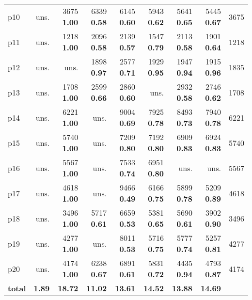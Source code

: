 \begin{tabular}{|l|rrrrrrr|r|}
p10 & uns. & {\footnotesize 3675} \textbf{1.00} & {\footnotesize 6339} \textbf{0.58} & {\footnotesize 6145} \textbf{0.60} & {\footnotesize 5943} \textbf{0.62} & {\footnotesize 5641} \textbf{0.65} & {\footnotesize 5445} \textbf{0.67} & 3675\\
p11 & uns. & {\footnotesize 1218} \textbf{1.00} & {\footnotesize 2096} \textbf{0.58} & {\footnotesize 2139} \textbf{0.57} & {\footnotesize 1547} \textbf{0.79} & {\footnotesize 2113} \textbf{0.58} & {\footnotesize 1901} \textbf{0.64} & 1218\\
p12 & uns. & uns. & {\footnotesize 1898} \textbf{0.97} & {\footnotesize 2577} \textbf{0.71} & {\footnotesize 1929} \textbf{0.95} & {\footnotesize 1947} \textbf{0.94} & {\footnotesize 1915} \textbf{0.96} & 1835\\
p13 & uns. & {\footnotesize 1708} \textbf{1.00} & {\footnotesize 2599} \textbf{0.66} & {\footnotesize 2860} \textbf{0.60} & uns. & {\footnotesize 2932} \textbf{0.58} & {\footnotesize 2746} \textbf{0.62} & 1708\\
p14 & uns. & {\footnotesize 6221} \textbf{1.00} & uns. & {\footnotesize 9004} \textbf{0.69} & {\footnotesize 7925} \textbf{0.78} & {\footnotesize 8493} \textbf{0.73} & {\footnotesize 7940} \textbf{0.78} & 6221\\
p15 & uns. & {\footnotesize 5740} \textbf{1.00} & uns. & {\footnotesize 7209} \textbf{0.80} & {\footnotesize 7192} \textbf{0.80} & {\footnotesize 6909} \textbf{0.83} & {\footnotesize 6924} \textbf{0.83} & 5740\\
p16 & uns. & {\footnotesize 5567} \textbf{1.00} & uns. & {\footnotesize 7533} \textbf{0.74} & {\footnotesize 6951} \textbf{0.80} & uns. & uns. & 5567\\
p17 & uns. & {\footnotesize 4618} \textbf{1.00} & uns. & {\footnotesize 9466} \textbf{0.49} & {\footnotesize 6166} \textbf{0.75} & {\footnotesize 5899} \textbf{0.78} & {\footnotesize 5209} \textbf{0.89} & 4618\\
p18 & uns. & {\footnotesize 3496} \textbf{1.00} & {\footnotesize 5717} \textbf{0.61} & {\footnotesize 6659} \textbf{0.53} & {\footnotesize 5381} \textbf{0.65} & {\footnotesize 5690} \textbf{0.61} & {\footnotesize 3902} \textbf{0.90} & 3496\\
p19 & uns. & {\footnotesize 4277} \textbf{1.00} & uns. & {\footnotesize 8011} \textbf{0.53} & {\footnotesize 5716} \textbf{0.75} & {\footnotesize 5777} \textbf{0.74} & {\footnotesize 5257} \textbf{0.81} & 4277\\
p20 & uns. & {\footnotesize 4174} \textbf{1.00} & {\footnotesize 6238} \textbf{0.67} & {\footnotesize 6891} \textbf{0.61} & {\footnotesize 5831} \textbf{0.72} & {\footnotesize 4435} \textbf{0.94} & {\footnotesize 4793} \textbf{0.87} & 4174\\
\hline
\textbf{total} & \textbf{1.89} & \textbf{18.72} & \textbf{11.02} & \textbf{13.61} & \textbf{14.52} & \textbf{13.88} & \textbf{14.69} & \\
\hline
\end{tabular}

